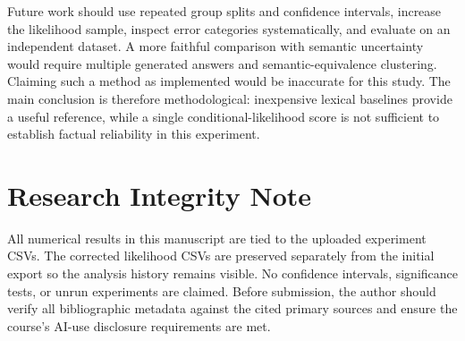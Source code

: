 \documentclass[acmsmall,nonacm]{acmart}
\begin{document}
Future work should use repeated group splits and confidence intervals, increase the likelihood sample, inspect error categories systematically, and evaluate on an independent dataset. A more faithful comparison with semantic uncertainty would require multiple generated answers and semantic-equivalence clustering. Claiming such a method as implemented would be inaccurate for this study. The main conclusion is therefore methodological: inexpensive lexical baselines provide a useful reference, while a single conditional-likelihood score is not sufficient to establish factual reliability in this experiment.

\section*{Research Integrity Note}
All numerical results in this manuscript are tied to the uploaded experiment CSVs. The corrected likelihood CSVs are preserved separately from the initial export so the analysis history remains visible. No confidence intervals, significance tests, or unrun experiments are claimed. Before submission, the author should verify all bibliographic metadata against the cited primary sources and ensure the course's AI-use disclosure requirements are met.


\end{document}

